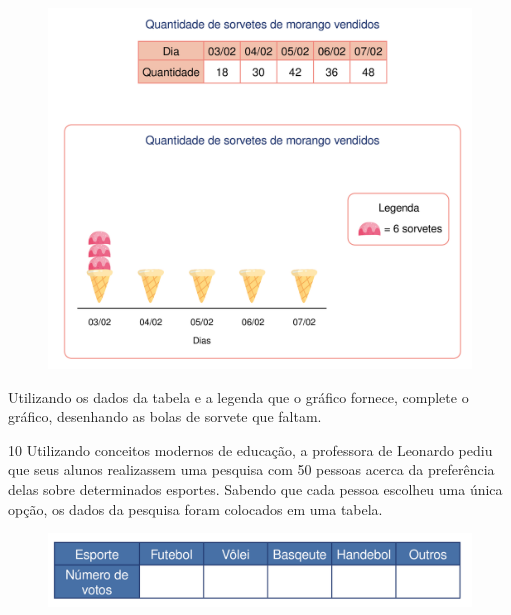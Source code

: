 \begin{figure}[htpb!]
\centering
\includegraphics[width=\textwidth]{./media/image84.png}
\end{figure}

Utilizando os dados da tabela e a legenda que o gráfico fornece,
complete o gráfico, desenhando as bolas de sorvete que faltam.

\pagebreak

\num{10} Utilizando conceitos modernos de educação, a professora de Leonardo
pediu que seus alunos realizassem uma pesquisa com 50 pessoas acerca da
preferência delas sobre determinados esportes. Sabendo que cada pessoa
escolheu uma única opção, os dados da pesquisa foram colocados em uma tabela.

\begin{figure}[htpb!]
\centering
\includegraphics[width=\textwidth]{./media/image85.png}
\end{figure}

